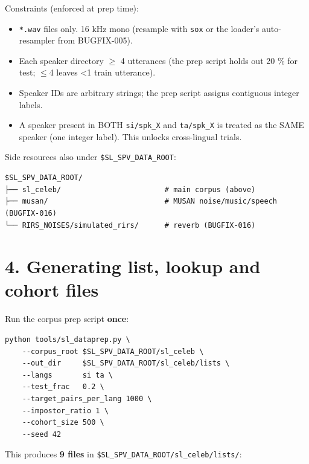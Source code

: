 \documentclass[10pt,a4paper]{article}
\begin{document}
Constraints (enforced at prep time):
\begin{itemize}[leftmargin=*,itemsep=2pt]
  \item \texttt{*.wav} files only. 16 kHz mono (resample with \texttt{sox} or the loader's auto-resampler from BUGFIX-005).
  \item Each speaker directory $\geq$ 4 utterances (the prep script holds out 20 \% for test; $\leq$4 leaves <1 train utterance).
  \item Speaker IDs are arbitrary strings; the prep script assigns contiguous integer labels.
  \item A speaker present in BOTH \texttt{si/spk\_X} and \texttt{ta/spk\_X} is treated as the SAME speaker (one integer label). This unlocks cross-lingual trials.
\end{itemize}

Side resources also under \texttt{\$SL\_SPV\_DATA\_ROOT}:

\begin{Verbatim}[fontsize=\small,frame=single,framesep=4pt]
$SL_SPV_DATA_ROOT/
├── sl_celeb/                        # main corpus (above)
├── musan/                           # MUSAN noise/music/speech (BUGFIX-016)
└── RIRS_NOISES/simulated_rirs/      # reverb (BUGFIX-016)
\end{Verbatim}


\section*{4. Generating list, lookup and cohort files}

Run the corpus prep script \textbf{once}:


\begin{Verbatim}[fontsize=\small,frame=single,framesep=4pt]
python tools/sl_dataprep.py \
    --corpus_root $SL_SPV_DATA_ROOT/sl_celeb \
    --out_dir     $SL_SPV_DATA_ROOT/sl_celeb/lists \
    --langs       si ta \
    --test_frac   0.2 \
    --target_pairs_per_lang 1000 \
    --impostor_ratio 1 \
    --cohort_size 500 \
    --seed 42
\end{Verbatim}


This produces \textbf{9 files} in \texttt{\$SL\_SPV\_DATA\_ROOT/sl\_celeb/lists/}:
\end{document}
